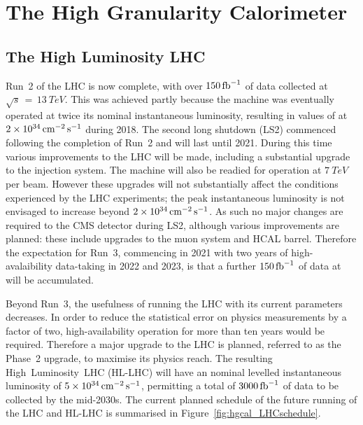\chapter{The High Granularity Calorimeter}
\label{chap:hgcal}

\section{The High Luminosity LHC}

Run~2 of the LHC is now complete, with over $\SI{150}{\ensuremath{\textrm{fb}^{-1}}}$ of data collected at $\sqrt{s}\,=\,\SI{13}{TeV}$. %
This was achieved partly because the machine was eventually operated at twice its nominal instantaneous luminosity, resulting in values of at $\SI{2e34}{\ensuremath{\textrm{cm}^{-2}\,\textrm{s}^{-1}}}$ during 2018.
The second long shutdown (LS2) commenced following the completion of Run~2 and will last until 2021.
During this time various improvements to the LHC will be made, including a substantial upgrade to the injection system.
The machine will also be readied for operation at $\SI{7}{TeV}$ per beam.
However these upgrades will not substantially affect the conditions experienced by the LHC experiments; 
the peak instantaneous luminosity is not envisaged to increase beyond $\SI{2e34}{\ensuremath{\textrm{cm}^{-2}\,\textrm{s}^{-1}}}$.
As such no major changes are required to the CMS detector during LS2, although various improvements are planned: 
these include upgrades to the muon system and HCAL barrel.
Therefore the expectation for Run~3, commencing in 2021 with two years of high-avalaibility data-taking in 2022 and 2023, 
is that a further $\SI{150}{\ensuremath{\textrm{fb}^{-1}}}$ of data at will be accumulated. 

Beyond Run~3, the usefulness of running the LHC with its current parameters decreases.
In order to reduce the statistical error on physics measurements by a factor of two, high-availability operation for more than ten years would be required.
Therefore a major upgrade to the LHC is planned, referred to as the Phase~2 upgrade, to maximise its physics reach.
The resulting High~Luminosity~LHC (HL-LHC) \cite{HLLHC} will have an nominal levelled instantaneous luminosity of $\SI{5e34}{\ensuremath{\textrm{cm}^{-2}\,\textrm{s}^{-1}}}$, 
permitting a total of $\SI{3000}{\ensuremath{\textrm{fb}^{-1}}}$ of data to be collected by the mid-2030s.
The current planned schedule of the future running of the LHC and HL-LHC is summarised in Figure~\ref{fig:hgcal_LHCschedule}.

